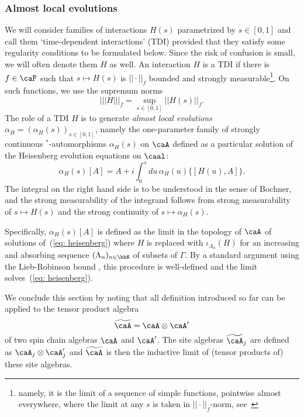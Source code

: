 \subsubsection{Almost local evolutions}\label{ALEs}

We will consider families of interactions $H(s)$ parametrized by $s\in [0,1]$ and call them `time-dependent interactions' (TDI) provided that they satisfy some regularity conditions to be formulated below. Since the risk of confusion is small, we will often denote them $H$ as well. An interaction $H$ is a TDI if there is $f\in\caF$ such that $s\mapsto H(s)$ is $||\cdot||_f$ bounded and strongly measurable\footnote{namely, it is the limit of a sequence of simple functions, pointwise almost everywhere, where the limit at any $s$ is taken in $||\cdot||_f$-norm, see~\cite{diestel1978vector} }.  On such functions, we use the supremum norms 
$$
|||H |||_{f}=\sup_{s\in[0,1]} ||H(s)||_{f}.
$$
The role of a TDI $H$ is to generate \emph{almost local evolutions} $\alpha_H=(\alpha_H(s))_{s\in[0,1]}$, namely the one-parameter family of strongly continuous $^*$-automorphisms $\alpha_H(s)$ on $\caA$ defined as a particular solution of the Heisenberg evolution equations on $\caal$:
\begin{equation}\label{eq: heisenberg}
	\alpha_H(s)[A]= A +i\int_0^s du\, \alpha_H(u) \{ [H(u),A] \}.
\end{equation} 
The integral on the right hand side is to be understood in the sense of Bochner, and the strong measurability of the integrand follows from strong measurability of $s\mapsto H(s)$ and the strong continuity of $s\mapsto \alpha_H(s)$. 

Specifically, $\alpha_H(s)[A]$ is defined as the limit in the topology of $\caA$ of solutions of~(\ref{eq: heisenberg}) where $H$ is replaced with $\iota_{\Lambda_n}(H)$ for an increasing and absorbing sequence $(\Lambda_n)_{n\in\bbN}$ of subsets of $\Gamma$. By a standard argument using the Lieb-Robinson bound \cite{Lieb:1972ts,nachtergaele2006propagation}, this procedure is well-defined and the limit solves~(\ref{eq: heisenberg}). 


We conclude this section by noting that all definition introduced so far can be applied to the tensor product algebra
$$
\widetilde \caA= \caA \otimes  \caA'
$$
of two spin chain algebras $\caA$ and $\caA'$. The site algebras $\widetilde \caA_j$ are defined as $\caA_j\otimes\caA'_j$ and $\widetilde\caA$ is then the inductive limit of (tensor products of) these site algebras.


